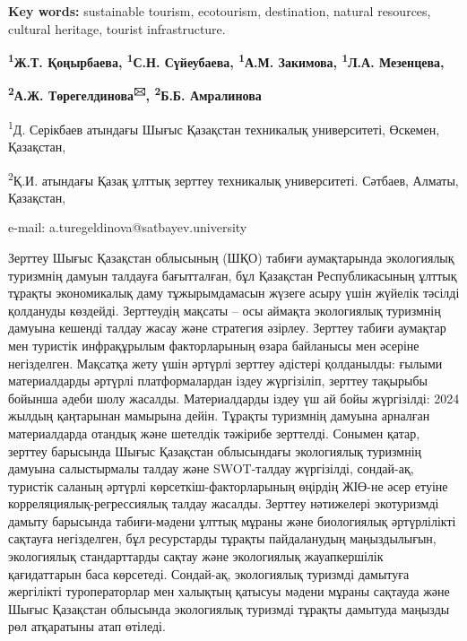 {\bfseries Key words:} sustainable tourism, ecotourism, destination,
natural resources, cultural heritage, tourist infrastructure.


\begin{center}
{\bfseries \textsuperscript{1}Ж.Т. Қоңырбаева, \textsuperscript{1}С.Н.
Сүйеубаева, \textsuperscript{1}А.М. Закимова, \textsuperscript{1}Л.А.
Мезенцева,}

{\bfseries \textsuperscript{2}А.Ж. Төрегелдинова\textsuperscript{🖂},
\textsuperscript{2}Б.Б. Амралинова}

\textsuperscript{1}Д. Серікбаев атындағы Шығыс Қазақстан техникалық
университеті, Өскемен, Қазақстан,

\textsuperscript{2}Қ.И. атындағы Қазақ ұлттық зерттеу техникалық
университеті. Сәтбаев, Алматы, Қазақстан,

e-mail: a.turegeldinova@satbayev.university
\end{center}

Зерттеу Шығыс Қазақстан облысының (ШҚО) табиғи аумақтарында экологиялық
туризмнің дамуын талдауға бағытталған, бұл Қазақстан Республикасының
ұлттық тұрақты экономикалық даму тұжырымдамасын жүзеге асыру үшін
жүйелік тәсілді қолдануды көздейді. Зерттеудің мақсаты -- осы аймақта
экологиялық туризмнің дамуына кешенді талдау жасау және стратегия
әзірлеу. Зерттеу табиғи аумақтар мен туристік инфрақұрылым факторларының
өзара байланысы мен әсеріне негізделген. Мақсатқа жету үшін әртүрлі
зерттеу әдістері қолданылды: ғылыми материалдарды әртүрлі
платформалардан іздеу жүргізіліп, зерттеу тақырыбы бойынша әдеби шолу
жасалды. Материалдарды іздеу үш ай бойы жүргізілді: 2024 жылдың
қаңтарынан мамырына дейін. Тұрақты туризмнің дамуына арналған
материалдарда отандық және шетелдік тәжірибе зерттелді. Сонымен қатар,
зерттеу барысында Шығыс Қазақстан облысындағы экологиялық туризмнің
дамуына салыстырмалы талдау және SWOT-талдау жүргізілді, сондай-ақ,
туристік саланың әртүрлі көрсеткіш-факторларының өңірдің ЖІӨ-не әсер
етуіне корреляциялық-регрессиялық талдау жасалды. Зерттеу нәтижелері
экотуризмді дамыту барысында табиғи-мәдени ұлттық мұраны және
биологиялық әртүрлілікті сақтауға негізделген, бұл ресурстарды тұрақты
пайдаланудың маңыздылығын, экологиялық стандарттарды сақтау және
экологиялық жауапкершілік қағидаттарын баса көрсетеді. Сондай-ақ,
экологиялық туризмді дамытуға жергілікті туроператорлар мен халықтың
қатысуы мәдени мұраны сақтауда және Шығыс Қазақстан облысында
экологиялық туризмді тұрақты дамытуда маңызды рөл атқаратыны атап
өтіледі.

